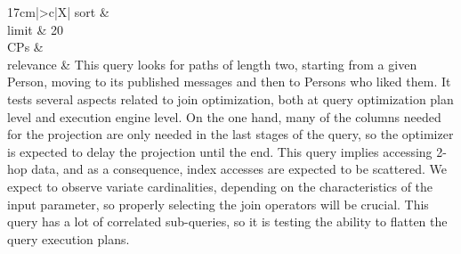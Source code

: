 \begin{tabularx}{17cm}{|>{\small \sf}c|X|}
%
	sort        &
	\vspace{1.1ex} \\ \hline
	limit       & 20 \\ \hline
	CPs &
	 \\ \hline
    relevance &
      \small This query looks for paths of length two, starting from a given Person, moving
to its published messages and then to Persons who liked them. It tests several aspects related to join optimization,
both at query optimization plan level and execution engine level. On the one hand, many of the columns needed for
the projection are only needed in the last stages of the query, so the optimizer is expected to delay the projection
until the end. This query implies accessing 2-hop data, and as a consequence, index accesses are expected to be
scattered. We expect to observe variate cardinalities, depending on the characteristics of the input parameter, so
properly selecting the join operators will be crucial. This query has a lot of correlated sub-queries, so it is testing
the ability to flatten the query execution plans.
 \\ \hline%
\end{tabularx}
\vspace{2ex}